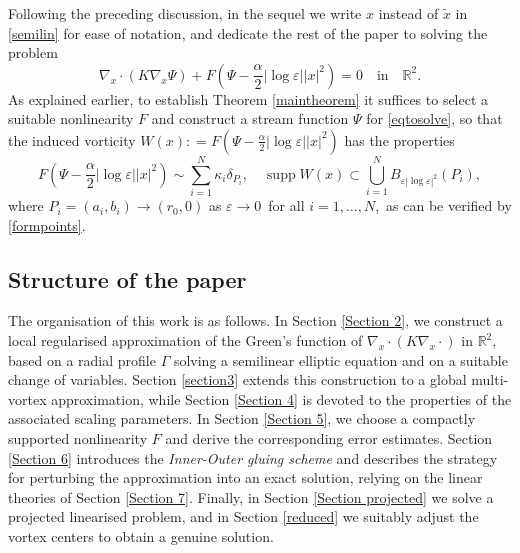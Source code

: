 \documentclass[11pt,reqno,a4paper]{amsart}
\numberwithin{equation}{section}
\newcommand{\R}{\mathbb{R}}
\newcommand{\defeq}{\mathrel{\mathop:}=}
\newcommand{\ve}{\varepsilon}
\begin{document}
Following the preceding discussion, in the sequel we write $x$ instead of $\tilde{x}$ in \eqref{semilin} for ease of notation, and dedicate the rest of the paper to solving  the problem
\begin{equation}\label{eqtosolve}
\nabla_{x}\cdot\left(K\nabla_{x}\Psi\right)+F\left(\Psi-\frac{\alpha}{2}|\log\ve||x|^2\right)=0 \quad \mbox{in} \quad \R^2.
\end{equation}
As explained earlier, to establish Theorem \ref{maintheorem} it suffices to select a suitable nonlinearity $F$ and construct a stream function  $\Psi$ for \eqref{eqtosolve}, so that the induced vorticity  $W(x)\defeq F\left(\Psi-\frac{\alpha}{2}|\log\ve||x|^2\right)$ has the properties
\begin{equation}\label{propvorticity}
 F\left(\Psi-\frac{\alpha}{2}|\log\ve||x|^2\right)\sim \sum_{i=1}^{N} \kappa_i \delta_{P_i}, \quad \operatorname{supp}W(x) \subset \bigcup_{i=1}^{N} B_{\ve|\log\ve|^2}(P_i),
 \end{equation}
 where $P_i=(a_i,b_i)\to (r_0,0)$ as $\ve\to0\,$ for all $i=1,\dots,N,$ as can be verified by \eqref{formpoints}. 
\subsection{Structure of the paper}
The organisation of this work is as follows. In Section \ref{Section 2}, we construct a local regularised approximation of the Green’s function of $\nabla_{x}\cdot(K\nabla_{x}\cdot)$ in $\R^2$, based on a radial profile $\Gamma$ solving a semilinear elliptic equation and on a suitable change of variables. Section \ref{section3} extends this construction to a global multi-vortex approximation, while Section \ref{Section 4} is devoted to the properties of the associated scaling parameters. In Section \ref{Section 5}, we choose a compactly supported nonlinearity $F$ and derive the corresponding error estimates. Section \ref{Section 6} introduces the \emph{Inner-Outer gluing scheme} and describes the strategy for perturbing the approximation into an exact solution, relying on the linear theories of Section \ref{Section 7}. Finally, in Section \ref{Section projected} we solve a projected linearised problem, and in Section \ref{reduced} we suitably adjust the vortex centers to obtain a genuine solution.
\end{document}
